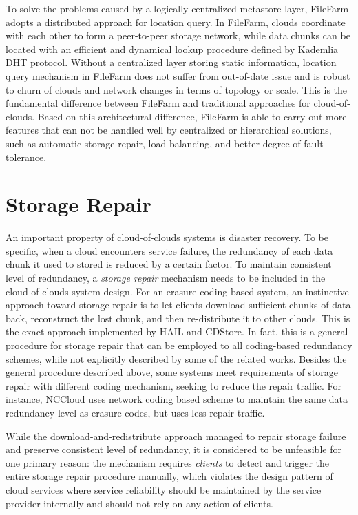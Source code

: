 To solve the problems caused by a logically-centralized metastore layer, FileFarm adopts a distributed approach for location query. In FileFarm, clouds coordinate with each other to form a peer-to-peer storage network, while data chunks can be located with an efficient and dynamical lookup procedure defined by Kademlia\cite{maymounkov2002kademlia} DHT protocol. Without a centralized layer storing static information, location query mechanism in FileFarm does not suffer from out-of-date issue and is robust to churn of clouds and network changes in terms of topology or scale. This is the fundamental difference between FileFarm and traditional approaches for cloud-of-clouds. Based on this architectural difference, FileFarm is able to carry out more features that can not be handled well by centralized or hierarchical solutions, such as automatic storage repair, load-balancing, and better degree of fault tolerance.

\newpage

\section{Storage Repair}
\label{ss:cocstoragerepair}

An important property of cloud-of-clouds systems is disaster recovery. To be specific, when a cloud encounters service failure, the redundancy of each data chunk it used to stored is reduced by a certain factor. To maintain consistent level of redundancy, a \textit{storage repair} mechanism needs to be included in the cloud-of-clouds system design. For an erasure coding based system, an instinctive approach toward storage repair is to let clients download sufficient chunks of data back, reconstruct the lost chunk, and then re-distribute it to other clouds. This is the exact approach implemented by HAIL\cite{bowers2009hail} and CDStore\cite{li2015cdstore}. In fact, this is a general procedure for storage repair that can be employed to all coding-based redundancy schemes, while not explicitly described by some of the related works. Besides the general procedure described above, some systems meet requirements of storage repair with different coding mechanism, seeking to reduce the repair traffic. For instance, NCCloud\cite{hu2012nccloud} uses network coding based scheme to maintain the same data redundancy level as erasure codes, but uses less repair traffic.

While the download-and-redistribute approach managed to repair storage failure and preserve consistent level of redundancy, it is considered to be unfeasible for one primary reason: the mechanism requires \textit{clients} to detect and trigger the entire storage repair procedure manually, which violates the design pattern of cloud services where service reliability should be maintained by the service provider internally and should not rely on any action of clients.


